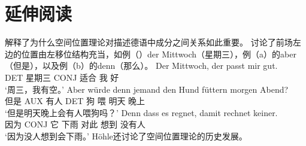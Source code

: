\section*{延伸阅读}
\citet{Reis80a}解释了为什么空间位置理论对描述德语中成分之间关系如此重要。 
\citet{Hoehle86}讨论了前场左边的位置由左移位结构充当，如例（）der Mittwoch（星期三），例（a）的aber（但是），以及例（b）的denn（那么）。
\ea
\gll Der Mittwoch, der passt mir gut.\\
	 DET 星期三 CONJ 适合 我 好\\
\glt `周三，我有空。'
\z
\eal
\ex 
\gll Aber würde denn jemand den Hund füttern morgen Abend?\\
     但是 AUX \particle{} 有人 DET 狗 喂 明天 晚上\\
\glt `但是明天晚上会有人喂狗吗？'
\ex 
\gll Denn dass es regnet, damit rechnet keiner.\\
     因为 CONJ 它 下雨 对此 想到 没有人\\
\glt `因为没人想到会下雨。'
\zl
Höhle还讨论了空间位置理论的历史发展。

